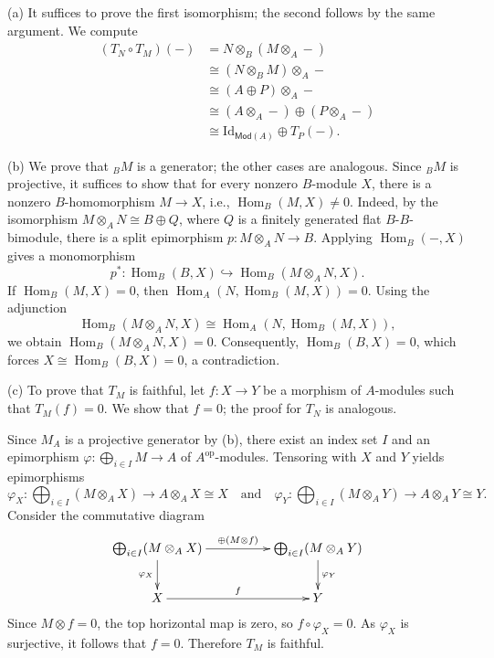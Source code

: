 \documentclass[12pt,twoside]{amsart}
\theoremstyle{bfupright head,slanted body}
\theoremstyle{bfupright head,upright body}
\theoremstyle{fixed bf head,slanted body}
\theoremstyle{fixed bf head,upright body}
\theoremstyle{numbered paragraph}
\newenvironment{prf*}[1][Proof]{%
  \begin{proof}[\bf #1]
    \setcounter{equation}{0}
    \renewcommand{\theequation}{\arabic{equation}}}
  {\end{proof}
}
\numberwithin{equation}{res}
\newcommand{\Mod}{\mathsf{Mod}}
\newcommand{\Id}{\mathrm{Id}}
\newcommand{\Hom}{\operatorname{Hom}}
\begin{document}
\begin{prf*}
(a) It suffices to prove the first isomorphism; the second follows by the same argument. We compute
\begin{align*}
(T_N\circ T_M)(-)
&= N\otimes_B(M\otimes_A-) \\
&\cong (N\otimes_B M)\otimes_A- \\
&\cong (A\oplus P)\otimes_A- \\
&\cong (A\otimes_A-)\oplus(P\otimes_A-) \\
&\cong \Id_{\Mod(A)}\oplus T_P(-).
\end{align*}

(b) We prove that \({}_BM\) is a generator; the other cases are analogous. Since \({}_BM\) is projective, it suffices to show that for every nonzero \(B\)-module \(X\), there is a nonzero \(B\)-homomorphism \(M\to X\), i.e., \(\Hom_B(M,X)\neq 0\). Indeed, by the isomorphism \(M\otimes_A N\cong B\oplus Q\), where \(Q\) is a finitely generated flat \(B\)-\(B\)-bimodule, there is a split epimorphism \(p:M\otimes_A N\to B\). Applying \(\Hom_B(-,X)\) gives a monomorphism
\[
p^*:\Hom_B(B,X)\hookrightarrow \Hom_B(M\otimes_A N,X).
\]
If \(\Hom_B(M,X)=0\), then \(\Hom_A(N,\Hom_B(M,X))=0\). Using the adjunction
\[
\Hom_B(M\otimes_A N,X)\cong \Hom_A(N,\Hom_B(M,X)),
\]
we obtain \(\Hom_B(M\otimes_A N,X)=0\). Consequently, \(\Hom_B(B,X)=0\), which forces \(X\cong \Hom_B(B,X)=0\), a contradiction.

(c) To prove that \(T_M\) is faithful, let \(f:X\to Y\) be a morphism of \(A\)-modules such that \(T_M(f)=0\). We show that \(f=0\); the proof for \(T_N\) is analogous.

Since \(M_A\) is a projective generator by (b), there exist an index set \(I\) and an epimorphism \(\varphi:\bigoplus_{i\in I}M\to A\) of \(A^{\mathrm{op}}\)-modules. Tensoring with \(X\) and \(Y\) yields epimorphisms
\[
\varphi_X:\bigoplus_{i\in I}(M\otimes_A X)\to A\otimes_A X\cong X
\quad\text{and}\quad
\varphi_Y:\bigoplus_{i\in I}(M\otimes_A Y)\to A\otimes_A Y\cong Y.
\]
Consider the commutative diagram
\[
\xymatrix@C=1.75cm{
   \bigoplus_{i\in I}(M\otimes_A X)
\ar[d]_-{\varphi_X}
\ar[r]^-{\oplus(M\otimes f)}
&  \bigoplus_{i\in I}(M\otimes_A Y)
\ar[d]^-{\varphi_Y}  \\
   X
\ar[r]^-{f}
& Y
}
\]
Since \(M\otimes f=0\), the top horizontal map is zero, so \(f\circ\varphi_X=0\). As \(\varphi_X\) is surjective, it follows that \(f=0\). Therefore \(T_M\) is faithful.
\end{prf*}
\end{document}
